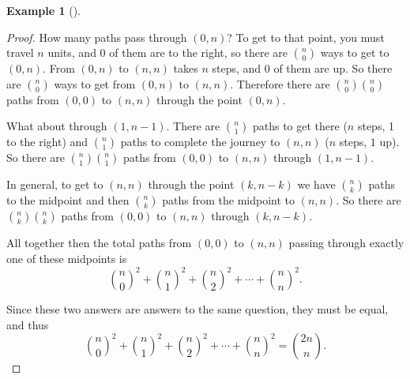 \documentclass[10pt,]{book}
\theoremstyle{plain}
\theoremstyle{definition}
\newtheorem{example}[theorem]{Example}
\theoremstyle{definition}
\theoremstyle{definition}
\numberwithin{equation}{section}
\begin{document}
\begin{example}[]
\begin{proof}
            How many paths pass through \((0,n)\)? To get to that point, you must travel \(n\) units, and \(0\) of them are to the right, so there are \({n \choose 0}\) ways to get to \((0,n)\). From \((0,n)\) to \((n,n)\) takes \(n\) steps, and \(0\) of them are up. So there are \({n \choose 0}\) ways to get from \((0,n)\) to \((n,n)\). Therefore there are \({n \choose 0}{n \choose 0}\) paths from \((0,0)\) to \((n,n)\) through the point \((0,n)\).
\par

            What about through \((1,n-1)\). There are \({n \choose 1}\) paths to get there (\(n\) steps, 1 to the right) and \({n \choose 1}\) paths to complete the journey to \((n,n)\) (\(n\) steps, \(1\) up). So there are \({n \choose 1}{n \choose 1}\) paths from \((0,0)\) to \((n,n)\) through \((1,n-1)\).
\par

            In general, to get to \((n,n)\) through the point \((k,n-k)\) we have \({n \choose k}\) paths to the midpoint and then \({n \choose k}\) paths from the midpoint to \((n,n)\). So there are \({n \choose k}{n \choose k}\) paths from \((0,0)\) to \((n,n)\) through \((k, n-k)\).
\par

            All together then the total paths from \((0,0)\) to \((n,n)\) passing through exactly one of these midpoints is
            \begin{equation*}
              {n \choose 0}^2 + {n \choose 1}^2 + {n \choose 2}^2 + \cdots + {n \choose n}^2.
            \end{equation*}
\par

            Since these two answers are answers to the same question, they must be equal, and thus
            \begin{equation*}
              {n \choose 0}^2 + {n \choose 1}^2 + {n \choose 2}^2 + \cdots + {n \choose n}^2 = {2n \choose n}.
            \end{equation*}
\end{proof}
\end{example}
\typeout{************************************************}
\typeout{************************************************}
\end{document}
